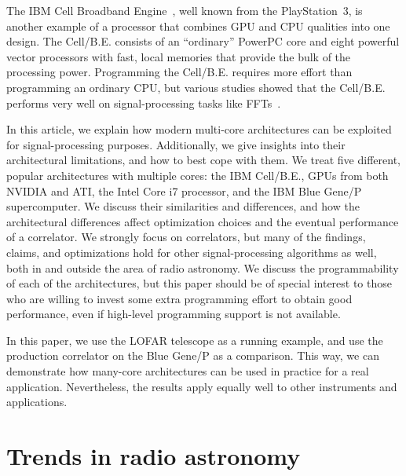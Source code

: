 \documentclass{article}
\begin{document}
The IBM Cell Broadband Engine~\cite{cell}, well known from the
PlayStation~3, is another example of a processor that combines GPU and CPU
qualities into one design.
The Cell/B.E. consists of an ``ordinary'' PowerPC core and eight powerful
vector processors with fast, local memories that provide
the bulk of the processing power.
Programming the Cell/B.E. requires more effort than programming an ordinary CPU,
but various studies showed that the Cell/B.E. performs very well on
signal-processing tasks like FFTs~\cite{fftc}.

In this article, we explain how modern multi-core architectures can be
exploited for signal-processing purposes.  Additionally, we give
insights into their architectural limitations, and how to best cope
with them.  We treat five different, popular architectures with
multiple cores: the IBM Cell/B.E., GPUs from both NVIDIA and ATI, the Intel Core i7 processor, and
the IBM Blue Gene/P supercomputer.  We discuss their
similarities and differences, and how the architectural differences
affect optimization choices and the eventual performance of a
correlator.  We strongly focus on correlators, but many of the
findings, claims, and optimizations hold for other signal-processing
algorithms as well, both in and outside the area of radio astronomy.
We discuss the programmability of each of the architectures, but this
paper should be of special interest to those who are willing to invest
some extra programming effort to obtain good performance, even if
high-level programming support is not available.

In this paper, we use the LOFAR telescope as a running example, and
use the production correlator on the Blue Gene/P as a comparison. This way,
we can demonstrate how many-core architectures can be used in practice for a real
application. Nevertheless, the results apply equally well to other
instruments and applications.


\section{Trends in radio astronomy}



\end{document}
